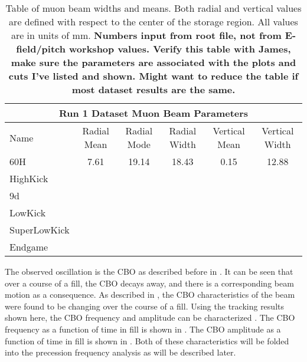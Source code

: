 \begin{landscape}
\begin{table}[]
\centering
\setlength\tabcolsep{10pt}
\renewcommand{\arraystretch}{1.2}
\begin{tabular*}{1\linewidth}{@{\extracolsep{\fill}}lccccc}
  \hline
    \multicolumn{6}{c}{\textbf{Run 1 Dataset Muon Beam Parameters}} \\
  \hline\hline
    Name & Radial Mean & Radial Mode & Radial Width & Vertical Mean & Vertical Width \\
  \hline
    60H & 7.61 & 19.14 & 18.43 & 0.15 & 12.88 \\
    HighKick &  &  &  &  &  \\
    9d &  &  &  &  &  \\
    LowKick &  &  &  &  &  \\
    SuperLowKick & &  &  &  &  \\
    Endgame &  &  &  &  &  \\
  \hline
\end{tabular*}
\caption[Run 1 dataset muon beam parameters]{Table of muon beam widths and means. Both radial and vertical values are defined with respect to the center of the storage region. All values are in units of mm. \textbf{Numbers input from root file, not from E-field/pitch workshop values. Verify this table with James, make sure the parameters are associated with the plots and cuts I've listed and shown. Might want to reduce the table if most dataset results are the same.}}
\label{tab:MuonBeamParameters}
\end{table}
\end{landscape}




The observed oscillation is the CBO as described before in . It can be seen that over a course of a fill, the CBO decays away, and there is a corresponding beam motion as a consequence. As described in , the CBO characteristics of the beam were found to be changing over the course of a fill. Using the tracking results shown here, the CBO frequency and amplitude can be characterized \cite{cbofrequency}. The CBO frequency as a function of time in fill is shown in . The CBO amplitude as a function of time in fill is shown in . Both of these characteristics will be folded into the precession frequency analysis as will be described later.





